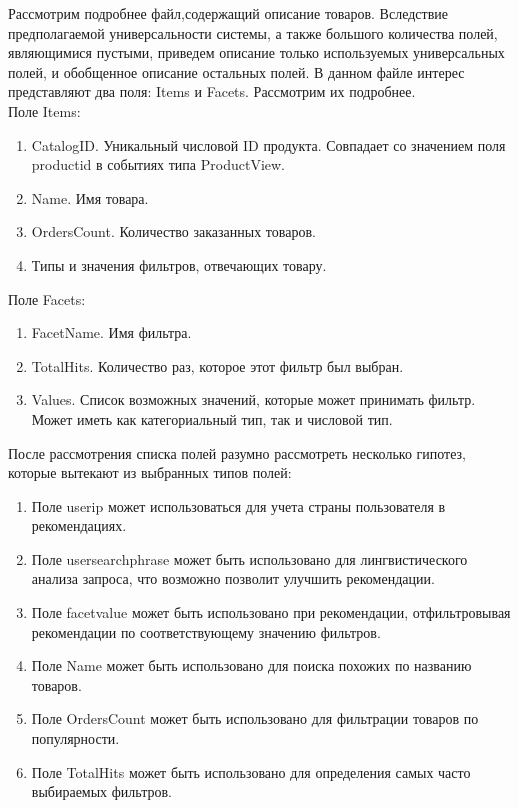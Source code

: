 \documentclass[14pt]{mmcs_article}
\newenvironment{myenumerate}
{ \begin{enumerate}
		\setlength{\itemsep}{0pt}
		\setlength{\parskip}{0pt}
		\setlength{\parsep}{0pt}     }
	{ \end{enumerate}                  }
\begin{document}
Рассмотрим подробнее файл,содержащий описание товаров. Вследствие предполагаемой универсальности системы, а также большого количества полей, являющимися пустыми, приведем описание только используемых универсальных полей, и обобщенное описание остальных полей.
В данном файле интерес представляют два поля: Items и Facets. Рассмотрим их подробнее. \\
Поле Items:
\begin{myenumerate}
	
	\item CatalogID. Уникальный числовой ID продукта. Совпадает со значением поля productid в событиях типа ProductView.
	\item Name. Имя товара. 
 	\item OrdersCount. Количество заказанных товаров. 
	\item Типы и значения фильтров, отвечающих товару.
\end{myenumerate}
Поле Facets:
\begin{myenumerate}
	
	\item FacetName. Имя фильтра.
	\item TotalHits. Количество раз, которое этот фильтр был выбран. 
	\item Values. Список возможных значений, которые может принимать фильтр. Может иметь как категориальный тип, так и числовой тип. 
\end{myenumerate}

После рассмотрения списка полей разумно рассмотреть несколько гипотез, которые вытекают из выбранных типов полей:
\begin{enumerate}
	\item Поле userip может использоваться для учета страны пользователя в рекомендациях.
	\item Поле usersearchphrase может быть использовано для лингвистического анализа запроса, что возможно позволит улучшить рекомендации.
	\item Поле facetvalue может быть использовано при рекомендации, отфильтровывая рекомендации по соответствующему значению фильтров.
	\item Поле Name может быть использовано для поиска похожих по названию товаров.
	\item Поле OrdersCount может быть использовано для фильтрации товаров по популярности.
	\item Поле TotalHits может быть использовано для определения самых часто выбираемых фильтров.
\end{enumerate}
\end{document}
